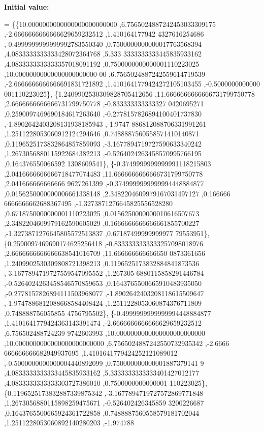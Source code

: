 {\bfseries Initial value\+:}
\begin{DoxyCode}
= \{\{10.0000000000000000000000000 ,6.7565024887242453033309175 ,-2.6666666666666629659232512 ,1.410164177942
      4327616254686 ,-0.4999999999999992783550340 ,0.7500000000000017763568394 ,4.0833333333333428072364768 ,5.333
      3333333333445835933162 ,4.0833333333333357018091192 ,0.7500000000000001110223025 ,10.00000000000000000000000
      00 ,6.7565024887242559614719539 ,-2.6666666666666691831721892 ,1.4101641779424272105103455 ,-0.5000000000000
      001110223025\},
\{1.2409902530309828705412656 ,11.6666666666666731799750778 ,2.6666666666666731799750778 ,-0.833333333333327
      0420695271 ,0.2590097469690184617263640 ,-0.2778157826894100401737830 ,-1.8902642403208131938185943 ,-1.9747
      886812088706331991261 ,1.2511228053060912124294646 ,0.7488887560558571410140871 ,0.1196525173832864857859093
       ,-3.1677894719727590633340242 ,1.2673056880115922684382213 ,-0.5264024263458570995766195 ,0.164376550066592
      1308609541\},
\{-0.3749999999999991118215803 ,2.0416666666666718477074483 ,11.6666666666666731799750778 ,2.041666666666666
      9627261399 ,-0.3749999999999994448884877 ,0.0156250000000006661338148 ,2.3482204609979167031497127 ,0.166666
      6666666662688367495 ,-1.3273871276645825556528280 ,0.6718750000000001110223025 ,0.0156250000000010616507673 
      ,2.3482204609979162590605029 ,0.1666666666666661855700227 ,-1.3273871276645805572513837 ,0.67187499999999977
      79553951\},
\{0.2590097469690174625256418 ,-0.8333333333333257098018976 ,2.6666666666666638541016709 ,11.666666666666650
      0873361656 ,1.2409902530309808721398213 ,0.1196525173832884841873536 ,-3.1677894719727559547095552 ,1.267305
      6880115858291446784 ,-0.5264024263458546570859653 ,0.1643765500665910483935050 ,-0.2778157826894111503968077
       ,-1.8902642403208118615509647 ,-1.9747886812088668584408424 ,1.2511228053060874376711809 ,0.748888756055855
      4756795502\},
\{-0.4999999999999994448884877 ,1.4101641779424363143391474 ,-2.6666666666666629659232512 ,6.756502488724239
      9742603993 ,10.0000000000000000000000000 ,10.0000000000000000000000000 ,6.7565024887242550732935342 ,-2.6666
      666666666682949937695 ,1.4101641779424252121089012 ,-0.5000000000000004440892099 ,0.750000000000001887379141
      9 ,4.0833333333333445835933162 ,5.3333333333333401427012177 ,4.0833333333333303727386010 ,0.7500000000000001
      110223025\},
\{0.1196525173832887339875342 ,-3.1677894719727572869771848 ,1.2673056880115898259475671 ,-0.526402426345859
      3200226687 ,0.1643765500665924361722858 ,0.7488887560558579181702044 ,1.2511228053060892140280203 ,-1.974788

\end{DoxyCode}
